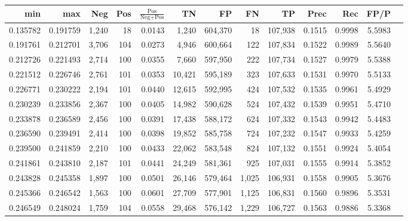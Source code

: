 \begin{tabular}{rrrrrrrrrrrrr}
\toprule
     min &      max &   Neg & Pos & $\frac{\text{Pos}}{\text{Neg}+\text{Pos}}$ &      TN &      FP &      FN &      TP &   Prec &    Rec &   FP/P \\
\midrule
0.135782 & 0.191759 & 1,240 &  18 &                                     0.0143 &   1,240 & 604,370 &      18 & 107,938 & 0.1515 & 0.9998 & 5.5983 \\
0.191761 & 0.212701 & 3,706 & 104 &                                     0.0273 &   4,946 & 600,664 &     122 & 107,834 & 0.1522 & 0.9989 & 5.5640 \\
0.212726 & 0.221493 & 2,714 & 100 &                                     0.0355 &   7,660 & 597,950 &     222 & 107,734 & 0.1527 & 0.9979 & 5.5388 \\
0.221512 & 0.226746 & 2,761 & 101 &                                     0.0353 &  10,421 & 595,189 &     323 & 107,633 & 0.1531 & 0.9970 & 5.5133 \\
0.226771 & 0.230222 & 2,194 & 101 &                                     0.0440 &  12,615 & 592,995 &     424 & 107,532 & 0.1535 & 0.9961 & 5.4929 \\
0.230239 & 0.233856 & 2,367 & 100 &                                     0.0405 &  14,982 & 590,628 &     524 & 107,432 & 0.1539 & 0.9951 & 5.4710 \\
0.233878 & 0.236589 & 2,456 & 100 &                                     0.0391 &  17,438 & 588,172 &     624 & 107,332 & 0.1543 & 0.9942 & 5.4483 \\
0.236590 & 0.239491 & 2,414 & 100 &                                     0.0398 &  19,852 & 585,758 &     724 & 107,232 & 0.1547 & 0.9933 & 5.4259 \\
0.239500 & 0.241859 & 2,210 & 100 &                                     0.0433 &  22,062 & 583,548 &     824 & 107,132 & 0.1551 & 0.9924 & 5.4054 \\
0.241861 & 0.243810 & 2,187 & 101 &                                     0.0441 &  24,249 & 581,361 &     925 & 107,031 & 0.1555 & 0.9914 & 5.3852 \\
0.243828 & 0.245358 & 1,897 & 100 &                                     0.0501 &  26,146 & 579,464 &   1,025 & 106,931 & 0.1558 & 0.9905 & 5.3676 \\
0.245366 & 0.246542 & 1,563 & 100 &                                     0.0601 &  27,709 & 577,901 &   1,125 & 106,831 & 0.1560 & 0.9896 & 5.3531 \\
0.246549 & 0.248024 & 1,759 & 104 &                                     0.0558 &  29,468 & 576,142 &   1,229 & 106,727 & 0.1563 & 0.9886 & 5.3368 \\

\end{tabular}
